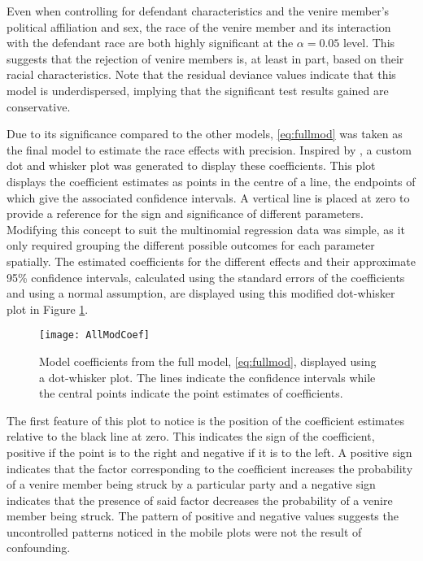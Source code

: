Even when controlling for defendant characteristics and the venire member's political affiliation and sex, the race of the venire
member and its interaction with the defendant race are both highly significant at the $\alpha = 0.05$ level. This suggests that
the rejection of venire members is, at least in part, based on their racial characteristics. Note that the residual deviance values indicate that this model
is underdispersed, implying that the significant test results gained
are conservative.

Due to its significance compared to the other models, \ref{eq:fullmod} was taken as the final model to estimate the race effects
with precision. Inspired by \cite{dotwhisker}, a custom dot and whisker plot was generated to display these coefficients. This plot displays the coefficient estimates as points in the centre of a line, the endpoints of which
give the associated confidence intervals. A vertical line is placed at zero to provide a reference for the sign and significance
of different parameters. Modifying this concept to suit the multinomial regression data was simple, as it only required grouping
the different possible outcomes for each parameter spatially.  The estimated coefficients for the different effects and their approximate 95\% confidence intervals, calculated using the standard errors of the coefficients and using a normal assumption, are displayed using this modified dot-whisker plot in Figure \ref{fig:modallcoef}.

\begin{figure}[h!]
  \centering
  \texttt{[image: AllModCoef]}
  \caption[All Model Coefficients]{\footnotesize Model coefficients from the full model, \ref{eq:fullmod}, displayed using
    a dot-whisker plot. The lines indicate the confidence intervals while the central points indicate the point estimates of
    coefficients.}
  \label{fig:modallcoef}
\end{figure}


The first feature of this plot to notice is the position of the coefficient estimates relative to the black line at zero. This
indicates the sign of the coefficient, positive if the point is to the right and negative if it is to the left. A positive sign
indicates that the factor corresponding to the coefficient increases the probability of a venire member being struck by a particular party and a negative sign indicates that the presence of said factor decreases the
probability of a venire member being struck. The pattern of positive and negative values suggests the uncontrolled patterns
noticed in the mobile plots were not the result of confounding.


